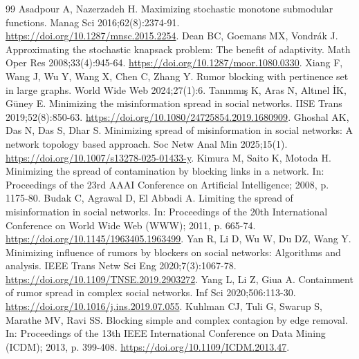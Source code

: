 \documentclass[preprint,11pt]{elsarticle}
\theoremstyle{definition}
\theoremstyle{remark}
\begin{document}
\begin{thebibliography}{99}
Asadpour A, Nazerzadeh H. Maximizing stochastic monotone submodular functions. Manag Sci 2016;62(8):2374-91. \url{https://doi.org/10.1287/mnsc.2015.2254}.
Dean BC, Goemans MX, Vondrák J. Approximating the stochastic knapsack problem: The benefit of adaptivity. Math Oper Res 2008;33(4):945-64. \url{https://doi.org/10.1287/moor.1080.0330}.
Xiang F, Wang J, Wu Y, Wang X, Chen C, Zhang Y. Rumor blocking with pertinence set in large graphs. World Wide Web 2024;27(1):6.
Tanınmış K, Aras N, Altınel İK, Güney E. Minimizing the misinformation spread in social networks. IISE Trans 2019;52(8):850-63. \url{https://doi.org/10.1080/24725854.2019.1680909}.
Ghoshal AK, Das N, Das S, Dhar S. Minimizing spread of misinformation in social networks: A network topology based approach. Soc Netw Anal Min 2025;15(1). \url{https://doi.org/10.1007/s13278-025-01433-y}.
Kimura M, Saito K, Motoda H. Minimizing the spread of contamination by blocking links in a network. In: Proceedings of the 23rd AAAI Conference on Artificial Intelligence; 2008, p. 1175-80.
Budak C, Agrawal D, El Abbadi A. Limiting the spread of misinformation in social networks. In: Proceedings of the 20th International Conference on World Wide Web (WWW); 2011, p. 665-74. \url{https://doi.org/10.1145/1963405.1963499}.
Yan R, Li D, Wu W, Du DZ, Wang Y. Minimizing influence of rumors by blockers on social networks: Algorithms and analysis. IEEE Trans Netw Sci Eng 2020;7(3):1067-78. \url{https://doi.org/10.1109/TNSE.2019.2903272}.
Yang L, Li Z, Giua A. Containment of rumor spread in complex social networks. Inf Sci 2020;506:113-30. \url{https://doi.org/10.1016/j.ins.2019.07.055}.
Kuhlman CJ, Tuli G, Swarup S, Marathe MV, Ravi SS. Blocking simple and complex contagion by edge removal. In: Proceedings of the 13th IEEE International Conference on Data Mining (ICDM); 2013, p. 399-408. \url{https://doi.org/10.1109/ICDM.2013.47}.

\end{thebibliography}
\end{document}
